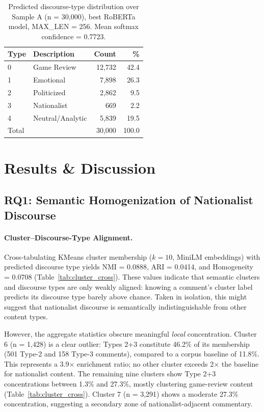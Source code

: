 \documentclass[letterpaper]{article}
\begin{document}
\begin{table}[t]
\centering
\caption{Predicted discourse-type distribution over Sample A (n = 30,000), best RoBERTa model, MAX\_LEN = 256. Mean softmax confidence = 0.7723.}
\label{tab:inference}
\begin{tabular}{llrr}
\toprule
Type & Description & Count & \% \\
\midrule
0 & Game Review & 12,732 & 42.4 \\
1 & Emotional & 7,898 & 26.3 \\
2 & Politicized & 2,862 & 9.5 \\
3 & Nationalist & 669 & 2.2 \\
4 & Neutral/Analytic & 5,839 & 19.5 \\
\midrule
Total & & 30,000 & 100.0 \\
\bottomrule
\end{tabular}
\end{table}

\section{Results \& Discussion}

\subsection{RQ1: Semantic Homogenization of Nationalist Discourse}
\label{sec:rq1}

\paragraph{Cluster--Discourse-Type Alignment.}
Cross-tabulating KMeans cluster membership ($k=10$, MiniLM embeddings) with predicted discourse type yields NMI = 0.0888, ARI = 0.0414, and Homogeneity = 0.0708 (Table~\ref{tab:cluster_cross}). These values indicate that semantic clusters and discourse types are only weakly aligned: knowing a comment's cluster label predicts its discourse type barely above chance. Taken in isolation, this might suggest that nationalist discourse is semantically indistinguishable from other content types.

However, the aggregate statistics obscure meaningful \textit{local} concentration. Cluster 6 (n = 1,428) is a clear outlier: Types 2+3 constitute 46.2\% of its membership (501 Type-2 and 158 Type-3 comments), compared to a corpus baseline of 11.8\%. This represents a 3.9$\times$ enrichment ratio; no other cluster exceeds 2$\times$ the baseline for nationalist content. The remaining nine clusters show Type 2+3 concentrations between 1.3\% and 27.3\%, mostly clustering game-review content (Table~\ref{tab:cluster_cross}). Cluster 7 (n = 3,291) shows a moderate 27.3\% concentration, suggesting a secondary zone of nationalist-adjacent commentary.
\end{document}
